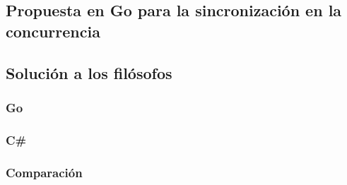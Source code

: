 \documentclass[10pt]{article} %
\begin{document}
\subsection{Propuesta en Go para la sincronización en la concurrencia}

\subsection{Solución a los filósofos}

\subsubsection{Go}

\subsubsection{C\#}

\subsubsection{Comparaci\'on}
\end{document}
